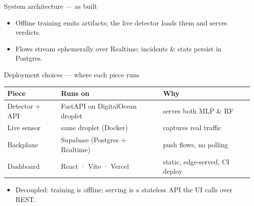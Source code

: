 \documentclass[aspectratio=169]{beamer}
\begin{document}
\begin{frame}{System architecture — as built}
  \vspace{0.4em}
  \centering
  \vspace{0.6em}
  \begin{itemize}\footnotesize
    \item Offline training emits artifacts; the live detector loads them and serves verdicts.
    \item Flows stream ephemerally over Realtime; incidents \& stats persist in Postgres.
  \end{itemize}
\end{frame}

\begin{frame}{Deployment choices — where each piece runs}
  \centering\renewcommand{\arraystretch}{1.3}
  \begin{tabular}{lll}
    \textbf{Piece} & \textbf{Runs on} & \textbf{Why}\\ \hline
    Detector + API   & FastAPI on DigitalOcean droplet & serves both MLP \& RF\\
    Live sensor      & same droplet (Docker) & captures real traffic\\
    Backplane        & Supabase (Postgres + Realtime) & push flows, no polling\\
    Dashboard        & React · Vite · Vercel & static, edge-served, CI deploy\\
  \end{tabular}
  \vspace{0.9em}
  \begin{itemize}\footnotesize
    \item Decoupled: training is offline; serving is a stateless API the UI calls over REST.
  \end{itemize}
\end{frame}
\end{document}
